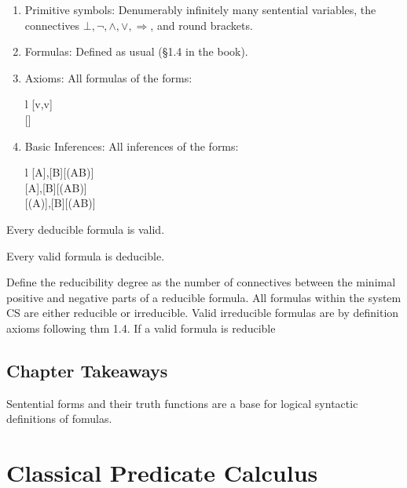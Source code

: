\documentclass[nobib,notoc]{tufte-handout}
\begin{document}
\begin{defi}
	\begin{enumerate}
		\item Primitive symbols: Denumerably infinitely many sentential variables, the connectives \(\bot, \neg, \wedge, \vee, \Rightarrow\), and round brackets.
		\item Formulas: Defined as usual (\S 1.4 in the book).
		\item Axioms: All formulas of the forms:
			\begin{IEEEeqnarray*}{l}
				[v,v]\\
				[\bot]
			\end{IEEEeqnarray*}
		\item Basic Inferences: All inferences of the forms:
			\begin{IEEEeqnarray*}{l}
				\mathscr{P}[A],[B]\vdash{}[(A\wedge B)]\\
				\mathscr{N}[A],[B]\vdash{}[(A\vee B)]\\
				[(A\Rightarrow\bot)],\mathscr{N}[B]\vdash{}[(A\Rightarrow B)]
			\end{IEEEeqnarray*}
	\end{enumerate}
\end{defi}
\begin{thm}
	Every deducible formula is valid.
\end{thm}
\begin{thm}
	Every valid formula is deducible.
	\begin{IEEEEproof}
		Define the reducibility degree as the number of connectives between the minimal positive and negative parts of a reducible formula. All formulas within the system CS are either reducible or irreducible. Valid irreducible formulas are by definition axioms following thm 1.4.
If a valid formula is reducible
	\end{IEEEEproof}
\end{thm}
\subsection{Chapter Takeaways}
Sentential forms and their truth functions are a base for logical syntactic definitions of fomulas.
\section{Classical Predicate Calculus}
\end{document}
